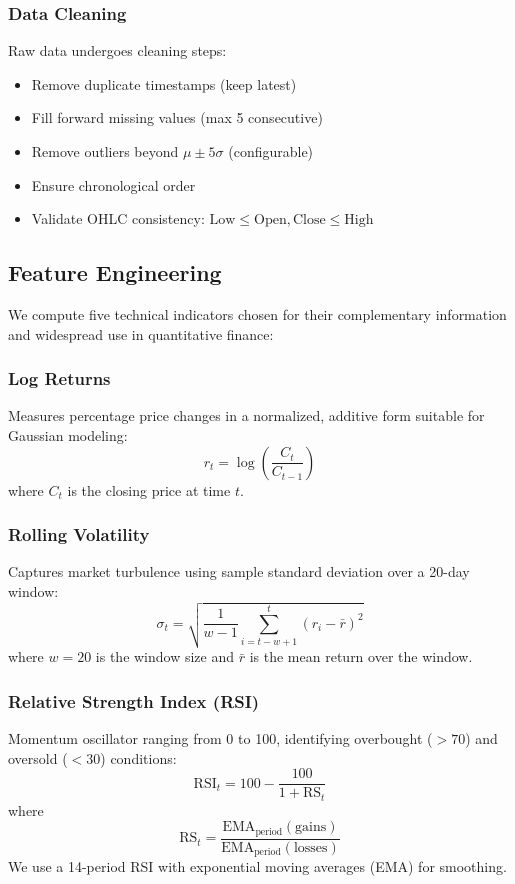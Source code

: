 \documentclass[conference]{IEEEtran}
\begin{document}
\subsubsection{Data Cleaning}
Raw data undergoes cleaning steps:
\begin{itemize}
\item Remove duplicate timestamps (keep latest)
\item Fill forward missing values (max 5 consecutive)
\item Remove outliers beyond $\mu \pm 5\sigma$ (configurable)
\item Ensure chronological order
\item Validate OHLC consistency: $\text{Low} \leq \text{Open}, \text{Close} \leq \text{High}$
\end{itemize}

\subsection{Feature Engineering}

We compute five technical indicators chosen for their complementary information and widespread use in quantitative finance:

\subsubsection{Log Returns}
Measures percentage price changes in a normalized, additive form suitable for Gaussian modeling:
\begin{equation}
r_t = \log\left(\frac{C_t}{C_{t-1}}\right)
\end{equation}
where $C_t$ is the closing price at time $t$.

\subsubsection{Rolling Volatility}
Captures market turbulence using sample standard deviation over a 20-day window:
\begin{equation}
\sigma_t = \sqrt{\frac{1}{w-1}\sum_{i=t-w+1}^{t}(r_i - \bar{r})^2}
\end{equation}
where $w=20$ is the window size and $\bar{r}$ is the mean return over the window.

\subsubsection{Relative Strength Index (RSI)}
Momentum oscillator ranging from 0 to 100, identifying overbought ($>70$) and oversold ($<30$) conditions:
\begin{equation}
\text{RSI}_t = 100 - \frac{100}{1 + \text{RS}_t}
\end{equation}
where
\begin{equation}
\text{RS}_t = \frac{\text{EMA}_{\text{period}}(\text{gains})}{\text{EMA}_{\text{period}}(\text{losses})}
\end{equation}
We use a 14-period RSI with exponential moving averages (EMA) for smoothing.
\end{document}
